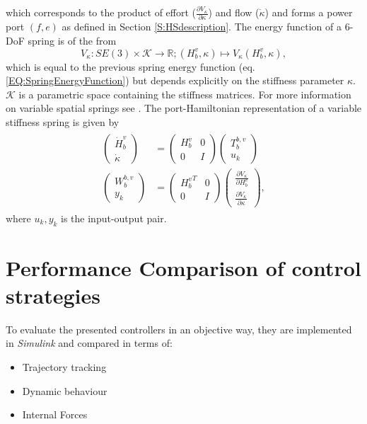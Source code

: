 \documentclass[a4paper,twoside, openright,12pt]{report}
\begin{document}
which corresponds to the product of effort ($\frac{\partial V_{\kappa}}{\partial \kappa}$) and flow ($\dot{\kappa}$) and forms a power port $(f,e)$ as defined in Section \ref{S:HSdescription}. The energy function of a $6$-DoF spring is of the from
\begin{equation}
V_{\kappa}:SE(3) \times \mathcal{K} \rightarrow \mathbb{R}; (H_b^v,\kappa)\mapsto V_{\kappa}(H_b^v,\kappa),
\end{equation}
which is equal to the previous spring energy function (eq. \ref{EQ:SpringEnergyFunction}) but depends explicitly on the stiffness parameter $\kappa$. $\mathcal{K}$ is a parametric space containing the stiffness matrices. For more information on variable spatial springs see \cite{Stramigioli_01c}. The port-Hamiltonian representation of a variable stiffness spring is given by
\begin{eqnarray}
\begin{aligned}
\begin{pmatrix}
\dot{H}_b^v \\ \dot{\kappa}
\end{pmatrix}
&=
\begin{pmatrix}
H_b^v & 0 \\ 0 & I
\end{pmatrix}
\begin{pmatrix}
T_b^{b,v} \\ u_k
\end{pmatrix}
\\
\begin{pmatrix}
W_b^{b,v} \\ y_k
\end{pmatrix}
&=
\begin{pmatrix}
{H_b^v}^T & 0 \\ 0 & I
\end{pmatrix}
\begin{pmatrix}
\frac{\partial V_{\kappa}}{\partial H_b^v} \\ \frac{\partial V_{\kappa}}{\partial \kappa}
\end{pmatrix},
\end{aligned}
\end{eqnarray}
where $u_k,y_k$ is the input-output pair. 


\section{Performance Comparison of control strategies}

To evaluate the presented controllers in an objective way, they are implemented in \emph{Simulink} and compared in terms of:
\begin{itemize}
	\item Trajectory tracking
	\item Dynamic behaviour
	\item Internal Forces
\end{itemize}
\end{document}
